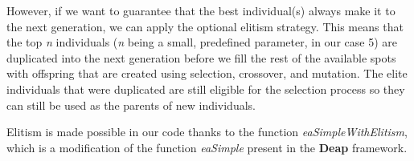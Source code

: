 However, if we want to guarantee that the best individual(s) always make it to the next generation, we can apply the optional elitism strategy. This means that the top \textit{n} individuals (\textit{n} being a small, predefined parameter, in our case 5) are duplicated into the next generation before we fill the rest of the available spots with offspring that are created using selection, crossover, and mutation. The elite individuals that were duplicated are still eligible for the selection process so they can still be used as the parents of new individuals.

Elitism is made possible in our code thanks to the function \textit{eaSimpleWithElitism}, which is a modification of the function \textit{eaSimple} present in the \textbf{Deap} framework.
